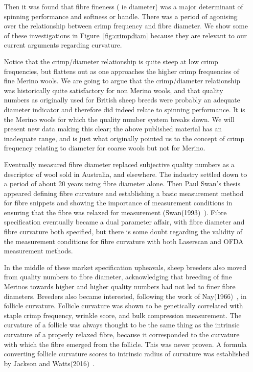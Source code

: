 \documentclass{article}
\begin{document}
Then it was found that fibre fineness ( ie diameter) was a major determinant of spinning performance and softness or handle. There was a period of agonising over the relationship between crimp frequency and fibre diameter. We show some of these investigations in Figure~\ref{fig:crimpdiam} because they are relevant to our current arguments regarding curvature. 

Notice that the crimp/diameter relationship is quite steep at low crimp frequencies, but flattens out as one approaches the higher crimp frequencies of fine Merino wools. We are going to argue that the crimp/diameter relationship was historically quite satisfactory for non Merino wools, and that quality numbers as originally used for British sheep breeds were probably an adequate diameter indicator and therefore did indeed  relate to spinning performance. It is the Merino wools for which the quality number system breaks down. We will present new data making this clear; the above published material has an inadequate range, and is just what originally pointed us to the concept of crimp frequency relating to diameter for coarse wools but not for Merino.

Eventually measured fibre diameter replaced subjective quality numbers as a descriptor of wool sold in Australia, and elsewhere. The industry settled down to a period of about 20 years using fibre diameter alone. Then Paul Swan's thesis appeared defining fibre curvature and establishing a basic measurement method for fibre snippets and showing the importance of measurement conditions in ensuring that the fibre was relaxed for measurement (Swan(1993)~\cite{swan-1993}).  Fibre specification eventually became a dual parameter affair, with fibre diameter and fibre curvature both specified, but there is some doubt regarding the validity of the measurement conditions for fibre curvature with both Laserscan and OFDA measurement methods. 

In the middle of these market specification upheavals, sheep breeders also moved from quality numbers to fibre diameter, acknowledging that breeding of fine Merinos towards higher and higher quality numbers had not led to finer fibre diameters. Breeders also became interested, following the work of Nay(1966)~\cite{nay-1966}, in follicle curvature.  Follicle curvature was shown to be genetically correlated with staple crimp frequency, wrinkle score, and bulk compression measurement. The curvature of a follicle was always thought to be the same thing as the intrinsic curvature of a properly relaxed fibre, because it corresponded to the curvature with which the fibre emerged from the follicle. This was never proven. A formula converting follicle curvature scores to intrinsic radius of curvature was established by Jackson and Watts(2016)~\cite{jackson-2016}.
\end{document}
